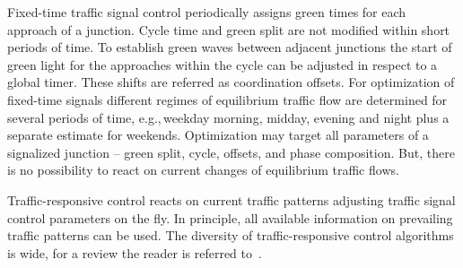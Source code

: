 Fixed-time traffic signal control periodically assigns green times for each approach of a junction. 
Cycle time and green split are not modified within short periods of time. 
To establish green waves between adjacent junctions the start of green light for the approaches within the cycle can be adjusted in respect to a global timer. 
These shifts are referred as coordination offsets. 
For optimization of fixed-time signals different regimes of equilibrium traffic flow are determined for several periods of time, e.g.,\,weekday morning, midday, evening and night plus a separate estimate for weekends. Optimization may target all parameters of a signalized junction -- green split, cycle, offsets, and phase composition.  
But, there is no possibility to react on current changes of equilibrium traffic flows. 

Traffic-responsive control reacts on current traffic patterns adjusting traffic signal control parameters on the fly. 
In principle, all available information on prevailing traffic patterns can be used. 
The diversity of traffic-responsive control algorithms is wide, for a review the reader is referred to~\citet[][]{Grether2014PhD}. 

